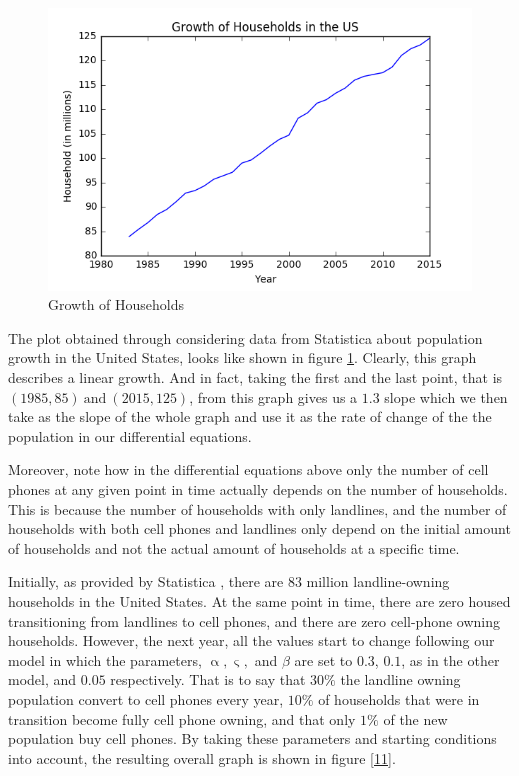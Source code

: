 \documentclass{article}
\begin{document}
\begin{figure}
    \centering
    \includegraphics[width=\textwidth]{HouseholdGrowth.png} 
    \caption{Growth of Households}
    \label{10}
\end{figure}
 
 The plot obtained through considering data from Statistica \cite{Households} about population growth in the United States, looks like shown in figure \ref{10}. Clearly, this graph describes a linear growth. And in fact, taking the first and the last point, that is $(1985, 85)~ \text{and} ~(2015, 125)$, from this graph gives us a $1.3$ slope which we then take as the slope of the whole graph and use it as the rate of change of the the population in our differential equations. \par 

Moreover, note how in the differential equations above only the number of cell phones at any given point in time actually depends on the number of households. This is because the number of households with only landlines, and the number of households with both cell phones and landlines only depend on the initial amount of households and not the actual amount of households at a specific time.\par

Initially, as provided by Statistica \cite{Households}, there are $83$ million landline-owning households in the United States. At the same point in time, there are zero housed transitioning from landlines to cell phones, and there are zero cell-phone owning households. However, the next year, all the values start to change following our model in which the parameters, $\upalpha, \upvarsigma, $ and $\beta$ are set to $0.3$, $0.1$, as in the other model, and $0.05$ respectively. That is to say that $30\%$ the landline owning population convert to cell phones every year, $10\%$ of households that were in transition become fully cell phone owning, and that only $1\%$ of the new population buy cell phones. By taking these parameters and starting conditions into account,  the resulting overall graph is shown in figure \ref{11}.\par 
\end{document}
